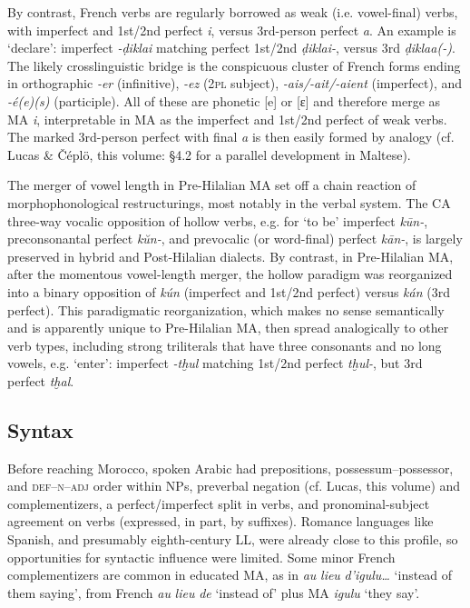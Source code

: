 \documentclass[output=paper]{langsci/langscibook}
\begin{document}
By contrast, French verbs are regularly borrowed as weak (i.e. vowel-final) verbs, with imperfect and 1st/2nd perfect \textit{i}, versus 3rd-person perfect \textit{a}. An example is ‘declare’: imperfect \textit{\nobreakdash-ḍikla{\R}i} matching perfect 1st/2nd \textit{ḍikla{\R}i-}, versus 3rd \textit{ḍikla{\R}a(-)}. The likely crosslinguistic bridge is the conspicuous cluster of French forms ending in orthographic \textit{{}-er} (infinitive), \textit{{}-ez} (2\textsc{pl} subject), \textit{{}-ais/-ait/-aient} (imperfect), and \textit{-é(e)(s)} (participle). All of these are phonetic [e] or [ɛ] and therefore merge as MA \textit{i}, interpretable in MA as the imperfect and 1st/2nd perfect of weak verbs. The marked 3rd-person perfect with final \textit{a} is then easily formed by analogy  (cf. Lucas \& Čéplö, this volume: §4.2 for a parallel development in Maltese).

The merger of vowel length in Pre-Hilalian MA set off a chain reaction of morphophonological restructurings, most notably in the verbal system. The CA three-way vocalic opposition of hollow verbs, e.g. for ‘to be’ imperfect \textit{kūn-}, preconsonantal perfect \textit{kŭn-}, and prevocalic (or word-final) perfect \textit{kān-}, is largely preserved in hybrid and Post-Hilalian dialects. By contrast, in Pre-Hilalian MA, after the momentous vowel-length merger, the hollow paradigm was reorganized into a binary opposition of \textit{kún} (imperfect and 1st/2nd perfect) versus \textit{kán} (3rd perfect). This paradigmatic reorganization, which makes no sense semantically and is apparently unique to Pre-Hilalian MA, then spread analogically to other verb types, including strong triliterals that have three consonants and no long vowels, e.g. ‘enter’: imperfect \textit{-tḫul} matching 1st/2nd perfect \textit{tḫul-}, but 3rd perfect \textit{tḫal}.

\subsection{Syntax}

Before reaching Morocco, spoken Arabic had prepositions, possessum--possessor, and \textsc{def--n--adj} order within NPs, preverbal negation (cf. Lucas, this volume) and complementizers, a perfect/imperfect split in verbs, and pronominal-subject agreement on verbs (expressed, in part, by suffixes). Romance languages like Spanish, and presumably eighth-century LL, were already close to this profile, so opportunities for syntactic influence were limited. Some minor French complementizers are common in educated MA, as in \textit{au} \textit{lieu} \textit{d’igulu…} ‘instead of them saying’, from French \textit{au} \textit{lieu} \textit{de} ‘instead of’ plus MA \textit{igulu} ‘they say’. 
\end{document}
